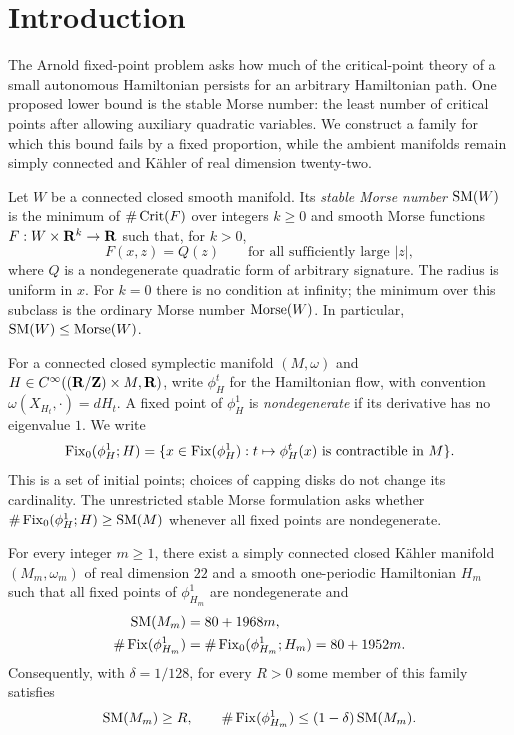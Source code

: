 \section{Introduction}
\label{sec:introduction}

The Arnold fixed-point problem asks how much of the critical-point theory of
a small autonomous Hamiltonian persists for an arbitrary Hamiltonian path.
One proposed lower bound is the stable Morse number: the least number of
critical points after allowing auxiliary quadratic variables. We construct a
family for which this bound fails by a fixed proportion, while the ambient
manifolds remain simply connected and Kähler of real dimension twenty-two.

Let $W$ be a connected closed smooth manifold. Its \emph{stable Morse number}
$\operatorname{SM}(W)$ is the minimum of $\#\operatorname{Crit}(F)$ over integers $k\geq0$ and smooth
Morse functions $F:W\times\mathbf R^k\to\mathbf R$ such that, for $k>0$,
\[
 F(x,z)=Q(z)\qquad\text{for all sufficiently large }|z|,
\]
where $Q$ is a nondegenerate quadratic form of arbitrary signature. The
radius is uniform in $x$. For $k=0$ there is no condition at infinity; the
minimum over this subclass is the ordinary Morse number $\operatorname{Morse}(W)$.
In particular, $\operatorname{SM}(W)\leq\operatorname{Morse}(W)$.

For a connected closed symplectic manifold $(M,\omega)$ and
$H\in C^\infty((\mathbf R/\mathbf Z)\times M,\mathbf R)$, write $\phi_H^t$ for the Hamiltonian
flow, with convention $\omega(X_{H_t},\cdot)=dH_t$. A fixed point of
$\phi_H^1$ is \emph{nondegenerate} if its derivative has no eigenvalue $1$.
We write
\[
 \operatorname{Fix}_0(\phi_H^1;H)
 =\{x\in\operatorname{Fix}(\phi_H^1):t\mapsto\phi_H^t(x)
          \text{ is contractible in }M\}.
\]
This is a set of initial points; choices of capping disks do not change its
cardinality. The unrestricted stable Morse formulation asks whether
$\#\operatorname{Fix}_0(\phi_H^1;H)\geq\operatorname{SM}(M)$ whenever all fixed points are
nondegenerate.

\begin{theorem}\label{thm:main}
For every integer $m\geq1$, there exist a simply connected closed Kähler
manifold $(M_m,\omega_m)$ of real dimension $22$ and a smooth one-periodic
Hamiltonian $H_m$ such that all fixed points of $\phi_{H_m}^1$ are
nondegenerate and
\begin{align*}
 \operatorname{SM}(M_m)&=80+1968m,\\
 \#\operatorname{Fix}(\phi_{H_m}^1)
 &=\#\operatorname{Fix}_0(\phi_{H_m}^1;H_m)=80+1952m.
\end{align*}
Consequently, with $\delta=1/128$, for every $R>0$ some member of this
family satisfies
\[
 \operatorname{SM}(M_m)\geq R,\qquad
 \#\operatorname{Fix}(\phi_{H_m}^1)\leq(1-\delta)\operatorname{SM}(M_m).
\]
\end{theorem}

